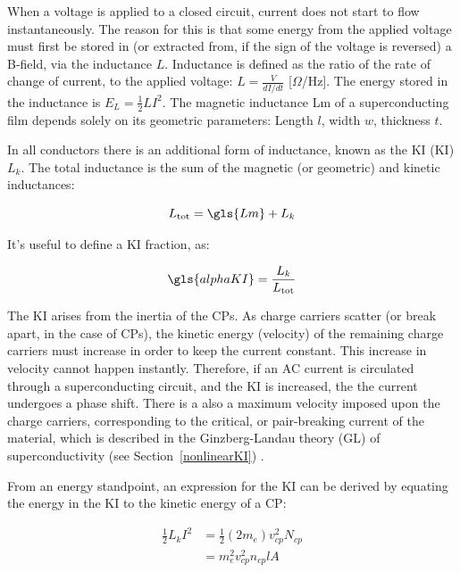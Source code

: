 When a voltage is applied to a closed circuit, current does not start to flow instantaneously. The reason for this is that some energy from the applied voltage must first be stored in (or extracted from, if the sign of the voltage is reversed) a B-field, via the inductance $L$. Inductance is defined as the ratio of the rate of change of current, to the applied voltage: $L = \frac{V}{dI/dt}$ [$\Omega$/Hz]. The energy stored in the inductance is $E_{L} = \frac{1}{2}LI^{2}$. The magnetic inductance \gls{Lm} of a superconducting film depends solely on its geometric parameters: Length $l$, width $w$, thickness $t$.

In all conductors there is an additional form of inductance, known as the KI (KI) $L_{k}$. The total inductance is the sum of the magnetic (or geometric) and kinetic inductances:

\begin{equation}
  L_{\mathrm{tot}} = \gls{Lm} + L_{k}
\end{equation}

It's useful to define a KI fraction, as:

\begin{equation}
  \gls{alphaKI} = \frac{L_{k}}{L_{\mathrm{tot}}}
\end{equation}

The KI arises from the inertia of the CPs. As charge carriers scatter (or break apart, in the case of CPs), the kinetic energy (velocity) of the remaining charge carriers must increase in order to keep the current constant. This increase in velocity cannot happen instantly. Therefore, if an AC current is circulated through a superconducting circuit, and the KI is increased, the the current undergoes a phase shift. There is a also a maximum velocity imposed upon the charge carriers, corresponding to the critical, or pair-breaking current of the material, which is described in the Ginzberg-Landau theory (GL) of superconductivity (see Section~\ref{nonlinearKI}) \citep{tinkham2004introduction}.

From an energy standpoint, an expression for the KI can be derived by equating the energy in the KI to the kinetic energy of a CP:

\begin{equation}
  \begin{aligned}
  \frac{1}{2}L_{k}I^{2} &= \frac{1}{2}(2m_{e})v_{cp}^{2}N_{cp}\\
                        &= m_{e}^{2}v_{cp}^{2}n_{cp}lA
  \end{aligned}
\end{equation}

